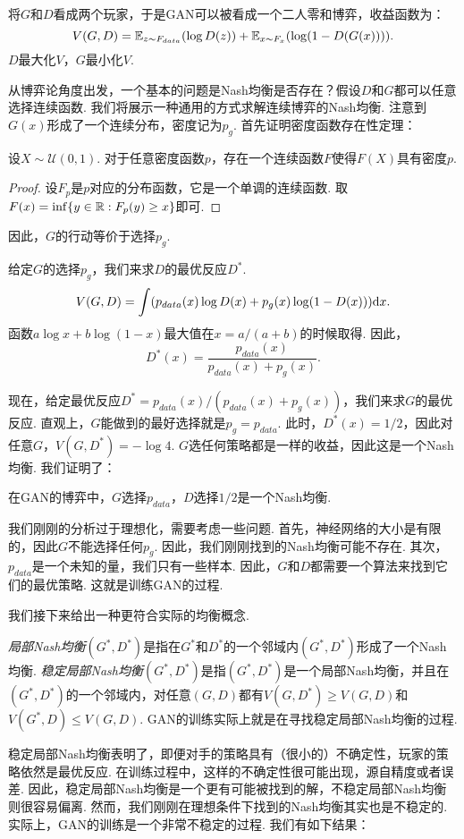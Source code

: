 将$G$和$D$看成两个玩家，于是GAN可以被看成一个二人零和博弈，收益函数为：
    \[
        V(G,D)=\mathbb{E}_{z\sim F_{data}}(\log D(z))+\mathbb{E}_{x\sim F_x}(\log(1-D(G(x)))).
    \]
$D$最大化$V$，$G$最小化$V$.

从博弈论角度出发，一个基本的问题是Nash均衡是否存在？假设$D$和$G$都可以任意选择连续函数. 我们将展示一种通用的方式求解连续博弈的Nash均衡. 注意到$G(x)$形成了一个连续分布，密度记为$p_g$.  首先证明密度函数存在性定理：
\begin{theorem}
设$X\sim \mathcal U(0,1)$. 对于任意密度函数$p$，存在一个连续函数$F$使得$F(X)$具有密度$p$.
\end{theorem}
\begin{proof}
设$F_p$是$p$对应的分布函数，它是一个单调的连续函数. 取$F(x)=\inf\{y\in \mathbb{R}: F_p(y)\geq x\}$即可.
\end{proof}
因此，$G$的行动等价于选择$p_g$.

给定$G$的选择$p_g$，我们来求$D$的最优反应$D^*$.
    \[V(G,D)=\int (p_{data}(x)\log D(x)+p_g(x)\log(1-D(x)))\mathrm{d} x.\]
函数$a\log x+b\log(1-x)$最大值在$x=a/(a+b)$的时候取得. 因此，
    \[D^*(x)=\frac{p_{data}(x)}{p_{data}(x)+p_g(x)}.\]
    
现在，给定最优反应$D^*=p_{data}(x)/(p_{data}(x)+p_g(x))$，我们来求$G$的最优反应. 直观上，$G$能做到的最好选择就是$p_g=p_{data}$. 此时，$D^*(x)=1/2$，因此对任意$G$，$V(G,D^*)=-\log 4$. $G$选任何策略都是一样的收益，因此这是一个Nash均衡. 我们证明了：
\begin{theorem}[GAN的Nash均衡存在性]
在GAN的博弈中，$G$选择$p_{data}$，$D$选择$1/2$是一个Nash均衡.
\end{theorem}

我们刚刚的分析过于理想化，需要考虑一些问题. 首先，神经网络的大小是有限的，因此$G$不能选择任何$p_g$. 因此，我们刚刚找到的Nash均衡可能不存在. 其次，$p_{data}$是一个未知的量，我们只有一些样本. 因此，$G$和$D$都需要一个算法来找到它们的最优策略. 这就是训练GAN的过程. 

我们接下来给出一种更符合实际的均衡概念. 

\emph{局部Nash均衡}$(G^*, D^*)$是指在$G^*$和$D^*$的一个邻域内$(G^*, D^*)$形成了一个Nash均衡. \emph{稳定局部Nash均衡}$(G^*, D^*)$是指$(G^*, D^*)$是一个局部Nash均衡，并且在$(G^*,D^*)$的一个邻域内，对任意$(G,D)$都有$V(G,D^*)\geq V(G,D)$和$V(G^*,D)\leq V(G,D)$. GAN的训练实际上就是在寻找稳定局部Nash均衡的过程. 

稳定局部Nash均衡表明了，即便对手的策略具有（很小的）不确定性，玩家的策略依然是最优反应. 在训练过程中，这样的不确定性很可能出现，源自精度或者误差. 因此，稳定局部Nash均衡是一个更有可能被找到的解，不稳定局部Nash均衡则很容易偏离. 然而，我们刚刚在理想条件下找到的Nash均衡其实也是不稳定的. 实际上，GAN的训练是一个非常不稳定的过程. 我们有如下结果：

